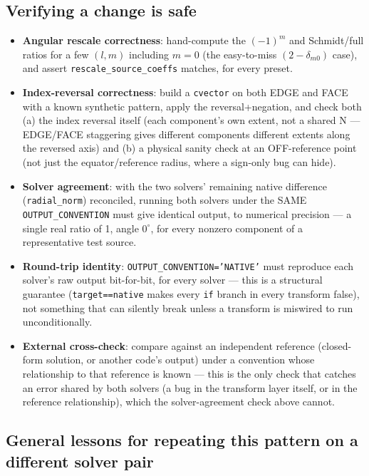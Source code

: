 \documentclass[11pt]{article}
\begin{document}
\subsection{Verifying a change is safe}
\label{sec:verify}

\begin{itemize}
\item \textbf{Angular rescale correctness}: hand-compute the $(-1)^m$ and Schmidt/full ratios for
a few $(l,m)$ including $m=0$ (the easy-to-miss $(2-\delta_{m0})$ case), and assert
\texttt{rescale\_source\_coeffs} matches, for every preset.
\item \textbf{Index-reversal correctness}: build a \texttt{cvector} on both EDGE and FACE with a
known synthetic pattern, apply the reversal+negation, and check both (a) the index reversal
itself (each component's own extent, not a shared N --- EDGE/FACE staggering gives different
components different extents along the reversed axis) and (b) a physical sanity check at an
OFF-reference point (not just the equator/reference radius, where a sign-only bug can hide).
\item \textbf{Solver agreement}: with the two solvers' remaining native difference
(\texttt{radial\_norm}) reconciled, running both solvers under the SAME
\texttt{OUTPUT\_CONVENTION} must give identical output, to numerical precision --- a single real
ratio of 1, angle $0^\circ$, for every nonzero component of a representative test source.
\item \textbf{Round-trip identity}: \texttt{OUTPUT\_CONVENTION='NATIVE'} must reproduce each
solver's raw output bit-for-bit, for every solver --- this is a structural guarantee
(\texttt{target==native} makes every \texttt{if} branch in every transform false), not something
that can silently break unless a transform is miswired to run unconditionally.
\item \textbf{External cross-check}: compare against an independent reference (closed-form
solution, or another code's output) under a convention whose relationship to that reference is
known --- this is the only check that catches an error shared by both solvers (a bug in the
transform layer itself, or in the reference relationship), which the solver-agreement check above
cannot.
\end{itemize}

\subsection{General lessons for repeating this pattern on a different solver pair}
\end{document}
